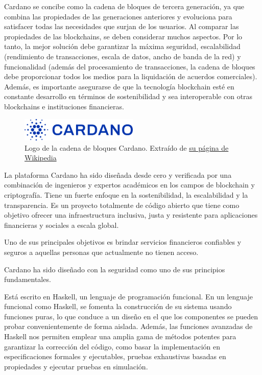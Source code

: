 \documentclass[12pt]{book}
\begin{document}
Cardano se concibe como la cadena de bloques de tercera generación, ya que combina las propiedades de las generaciones anteriores y evoluciona para satisfacer todas las necesidades que surjan de los usuarios. Al comparar las propiedades de las blockchains, se deben considerar muchos aspectos. Por lo tanto, la mejor solución debe garantizar la máxima seguridad, escalabilidad (rendimiento de transacciones, escala de datos, ancho de banda de la red) y funcionalidad (además del procesamiento de transacciones, la cadena de bloques debe proporcionar todos los medios para la liquidación de acuerdos comerciales). Además, es importante asegurarse de que la tecnología blockchain esté en constante desarrollo en términos de sostenibilidad y sea interoperable con otras blockchains e instituciones financieras.

\begin{figure}[H]
    \centering
    \includegraphics[width=0.5\textwidth]{Cardano_logo.png}
    \caption{Logo de la cadena de bloques Cardano. Extraído de \href{https://en.wikipedia.org/wiki/Cardano_(blockchain_platform)}{su página de Wikipedia}}\label{fig:Cardano_logo}
\end{figure}


La plataforma Cardano ha sido diseñada desde cero y verificada por una combinación de ingenieros y expertos académicos en los campos de blockchain y criptografía.
Tiene un fuerte enfoque en la sostenibilidad, la escalabilidad y la transparencia. 
Es un proyecto totalmente de código abierto que tiene como objetivo ofrecer una infraestructura inclusiva, justa y resistente para aplicaciones financieras y sociales a escala global. 

Uno de sus principales objetivos es brindar servicios financieros confiables y seguros a aquellas personas que actualmente no tienen acceso.

Cardano ha sido diseñado con la seguridad como uno de sus principios fundamentales. 

Está escrito en Haskell, un lenguaje de programación funcional. 
En un lenguaje funcional como Haskell, se fomenta la construcción de su sistema usando funciones puras, lo que conduce a un diseño en el que los componentes se pueden probar convenientemente de forma aislada. 
Además, las funciones avanzadas de Haskell nos permiten emplear una amplia gama de métodos potentes para garantizar la corrección del código, como basar la implementación en especificaciones formales y ejecutables, pruebas exhaustivas basadas en propiedades y ejecutar pruebas en simulación.
\end{document}
